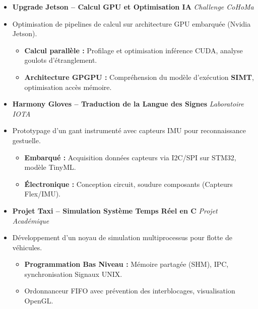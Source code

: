 \documentclass[a4paper,11pt]{article}
\begin{document}
\begin{itemize}[leftmargin=*, label={}]
\item \textbf{Upgrade Jetson -- Calcul GPU et Optimisation IA} \hfill \textit{Challenge CoHoMa}
\vspace{-2pt}
\item \small{Optimisation de pipelines de calcul sur architecture GPU embarquée (Nvidia Jetson).}
    \begin{itemize}[leftmargin=0.4cm, nosep, label=\tiny$\bullet$]
        \item \small{\textbf{Calcul parallèle :} Profilage et optimisation inférence CUDA, analyse goulots d'étranglement.}
        \item \small{\textbf{Architecture GPGPU :} Compréhension du modèle d'exécution \textbf{SIMT}, optimisation accès mémoire.}
    \end{itemize}
    \vspace{3pt}

\item \textbf{Harmony Gloves -- Traduction de la Langue des Signes} \hfill \textit{Laboratoire IOTA}
\vspace{-2pt}
\item \small{Prototypage d'un gant instrumenté avec capteurs IMU pour reconnaissance gestuelle.}
    \begin{itemize}[leftmargin=0.4cm, nosep, label=\tiny$\bullet$]
        \item \small{\textbf{Embarqué :} Acquisition données capteurs via I2C/SPI sur STM32, modèle TinyML.}
        \item \small{\textbf{Électronique :} Conception circuit, soudure composants (Capteurs Flex/IMU).}
    \end{itemize}
    \vspace{3pt}

\item \textbf{Projet Taxi -- Simulation Système Temps Réel en C} \hfill \textit{Projet Académique}
\vspace{-2pt}
\item \small{Développement d'un noyau de simulation multiprocessus pour flotte de véhicules.}
    \begin{itemize}[leftmargin=0.4cm, nosep, label=\tiny$\bullet$]
        \item \small{\textbf{Programmation Bas Niveau :} Mémoire partagée (SHM), IPC, synchronisation Signaux UNIX.}
        \item \small{Ordonnanceur FIFO avec prévention des interblocages, visualisation OpenGL.}
    \end{itemize}

\end{itemize}
\end{document}
